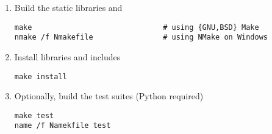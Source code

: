 \begin{enumerate}
\item Build the static libraries  and 
\begin{lstlisting}
make                              # using {GNU,BSD} Make
nmake /f Nmakefile                # using NMake on Windows
\end{lstlisting}
\item Install libraries and includes
\begin{lstlisting}
make install 
\end{lstlisting}
\item Optionally, build the test suites (Python required)
\begin{lstlisting}
make test
name /f Namekfile test
\end{lstlisting}
\end{enumerate}
